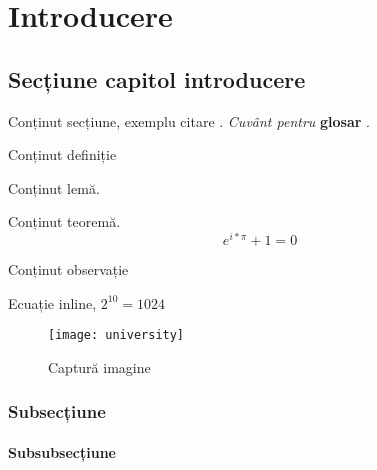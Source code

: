 \chapter{Introducere}

\section{Secțiune capitol introducere}

Conținut secțiune, exemplu citare \cite{hoare_csp}.
\textit{Cuvânt pentru} \textbf{glosar} .	

\begin{definition}
	Conținut definiție
\end{definition}

\begin{lemma}
	Conținut lemă.
\end{lemma}

\begin{theorem}
	Conținut teoremă.
	\[
		e^{i * \pi} + 1 = 0
	\]
\end{theorem}

\begin{remark}
	Conținut observație
\end{remark}

Ecuație inline, $2^{10} = 1024 $

\begin{figure}[h]
	\begin{center}
			\texttt{[image: university]}
	\end{center}
	\caption{Captură imagine}
\end{figure}


\subsection{Subsecțiune}

\subsubsection{Subsubsecțiune}